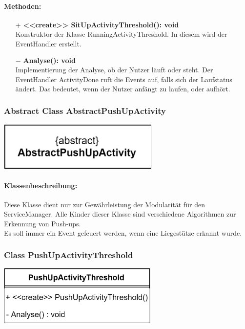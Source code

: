 \documentclass[a4paper,12pt]{article}
\begin{document}
	\paragraph{Methoden:}
	\begin{itemize}
		\item [+]\textbf{<<create>> SitUpActivityThreshold(): void}\\Konstruktor der Klasse RunningActivityThreshold. In diesem wird der EventHandler erstellt.
		\item [$-$]\textbf{Analyse(): void}\\Implementierung der Analyse, ob der Nutzer läuft oder steht. Der EventHandler ActivityDone ruft die Events auf, falls sich der Laufstatus ändert. Das bedeutet, wenn der Nutzer anfängt zu laufen, oder aufhört. 
		\newline	
\end{itemize}
	
	\begin{minipage}[b]{0.65\textwidth}
		\subsubsection{Abstract Class AbstractPushUpActivity}
		\end{minipage}
		\begin{minipage}[c]{0.5\textwidth}
			\includegraphics[width=0.6\textwidth]{bilder/EMKlassen/AbstractPushUpActivityClass.png}
		\end{minipage}
		
	\paragraph{Klassenbeschreibung:}
	Diese Klasse dient nur zur Gewährleistung der Modularität für den ServiceManager. Alle Kinder dieser Klasse sind verschiedene Algorithmen zur Erkennung von Push-ups.\\ Es soll immer ein Event gefeuert werden, wenn eine Liegestütze erkannt wurde.\\
	\newline
	\begin{minipage}[b]{0.6\textwidth}
		\subsubsection{Class PushUpActivityThreshold}
		\end{minipage}
		\begin{minipage}[c]{0.5\textwidth}
			\includegraphics[width=0.6\textwidth]{bilder/EMKlassen/PushUpActivityThresholdClass.png}
		\end{minipage}
\end{document}
